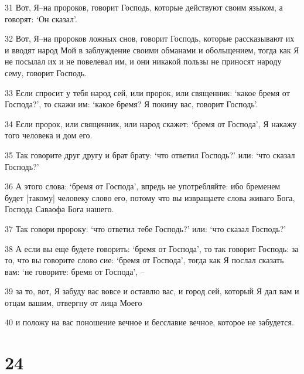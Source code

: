 \par 31 Вот, Я--на пророков, говорит Господь, которые действуют своим языком, а говорят: `Он сказал'.
\par 32 Вот, Я--на пророков ложных снов, говорит Господь, которые рассказывают их и вводят народ Мой в заблуждение своими обманами и обольщением, тогда как Я не посылал их и не повелевал им, и они никакой пользы не приносят народу сему, говорит Господь.
\par 33 Если спросит у тебя народ сей, или пророк, или священник: `какое бремя от Господа?', то скажи им: `какое бремя? Я покину вас, говорит Господь'.
\par 34 Если пророк, или священник, или народ скажет: `бремя от Господа', Я накажу того человека и дом его.
\par 35 Так говорите друг другу и брат брату: `что ответил Господь?' или: `что сказал Господь?'
\par 36 А этого слова: `бремя от Господа', впредь не употребляйте: ибо бременем будет [такому] человеку слово его, потому что вы извращаете слова живаго Бога, Господа Саваофа Бога нашего.
\par 37 Так говори пророку: `что ответил тебе Господь?' или: `что сказал Господь?'
\par 38 А если вы еще будете говорить: `бремя от Господа', то так говорит Господь: за то, что вы говорите слово сие: `бремя от Господа', тогда как Я послал сказать вам: `не говорите: бремя от Господа', --
\par 39 за то, вот, Я забуду вас вовсе и оставлю вас, и город сей, который Я дал вам и отцам вашим, отвергну от лица Моего
\par 40 и положу на вас поношение вечное и бесславие вечное, которое не забудется.

\chapter{24}

